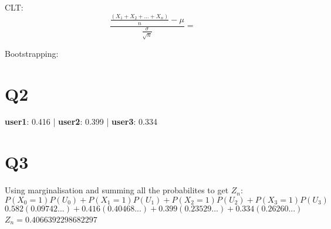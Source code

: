 \documentclass[a4paper,11pt]{article}
\theoremstyle{mytheor}
\begin{document}
    CLT:
    $$ \frac{\frac{(X_1+X_2+...+X_n)}{n} - \mu}{\frac{\sigma}{\sqrt{n}}}  = $$

    Bootstrapping:
    $$ $$
\section*{Q2}
    \textbf{user1}: 0.416 | \textbf{user2}: 0.399 | \textbf{user3}: 0.334

\newpage

\section*{Q3}
    Using marginalisation and summing all the probabilites to get $Z_n$:
    $$ P(X_0 = 1)P(U_0) + P(X_1 = 1)P(U_1) + P(X_2 = 1)P(U_2) + P(X_3 = 1)P(U_3) $$
    $$ 0.582(0.09742...) + 0.416(0.40468...) + 0.399(0.23529...) + 0.334(0.26260...) $$
    $ Z_n = 0.4066392298682297 $
\end{document}
